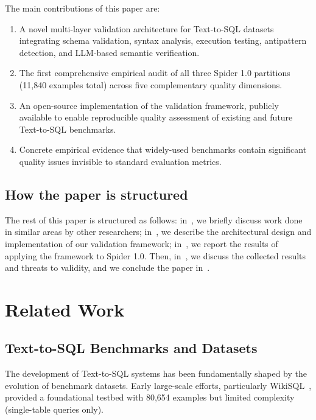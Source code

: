 \documentclass[]{einformatica}
\begin{document}
The main contributions of this paper are:

\begin{enumerate}
\item A novel multi-layer validation architecture for Text-to-SQL datasets integrating schema validation, syntax analysis, execution testing, antipattern detection, and LLM-based semantic verification.
\item The first comprehensive empirical audit of all three Spider 1.0 partitions (11,840 examples total) across five complementary quality dimensions.
\item An open-source implementation of the validation framework, publicly available to enable reproducible quality assessment of existing and future Text-to-SQL benchmarks.
\item Concrete empirical evidence that widely-used benchmarks contain significant quality issues invisible to standard evaluation metrics.
\end{enumerate}

\subsection*{How the paper is structured}

The rest of this paper is structured as follows: in~, we briefly discuss work done in similar areas by other researchers; in~, we describe the architectural design and implementation of our validation framework; in~, we report the results of applying the framework to Spider 1.0. Then, in~, we discuss the collected results and threats to validity, and we conclude the paper in~.

\section{Related Work}\label{sec:RelatedWork}

\subsection{Text-to-SQL Benchmarks and Datasets}

The development of Text-to-SQL systems has been fundamentally shaped by the evolution of benchmark datasets. Early large-scale efforts, particularly WikiSQL~\cite{zhong2017seq2sql}, provided a foundational testbed with 80,654 examples but limited complexity (single-table queries only).
\end{document}
